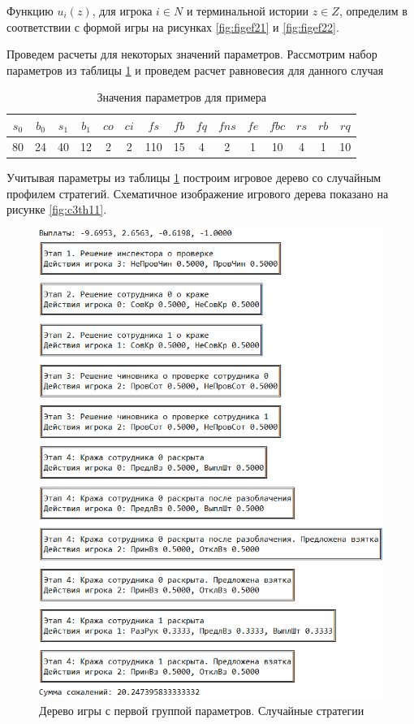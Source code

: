 Функцию $u_i(z)$, для игрока $i \in N$ и терминальной истории $z \in Z$, определим  в соответствии с формой игры на рисунках \ref{fig:figef21} и \ref{fig:figef22}.

Проведем расчеты для некоторых значений параметров. Рассмотрим набор параметров из таблицы \ref{tbl:s2_1} и проведем расчет равновесия для данного случая

\begin{table}[H]
	\centering
	\begin{tabular}[t]{|c|c|c|c|c|c|c|c|c|c|c|c|c|c|c|}
		\hline
		$s_0$ & $b_0$ & $s_1$ & $b_1$ & $co$ & $ci$ & $fs$ &	$fb$ & $fq$ & $fns$ & $fe$ & $fbc$ & $rs$ & $rb$ & $rq$\\
		\hline
		 80 & 24 & 40 & 12 & 2 & 2 & 110 & 15 & 4 & 2 & 1 & 10 & 4 & 1 & 10\\
		\hline
	\end{tabular}
	\caption{\centering Значения параметров для примера}
	\label{tbl:s2_1}
\end{table}
\par
Учитывая параметры из таблицы \ref{tbl:s2_1} построим игровое дерево со случайным профилем стратегий. Схематичное изображение игрового дерева показано на рисунке \ref{fig:c3th11}.

\begin{figure}[H]
	\centering
	\includegraphics[width=0.8\linewidth]{inc/img/c32th11}
	\caption{Дерево игры с первой группой параметров. Случайные стратегии}
	\label{fig:c32th11}
\end{figure}

